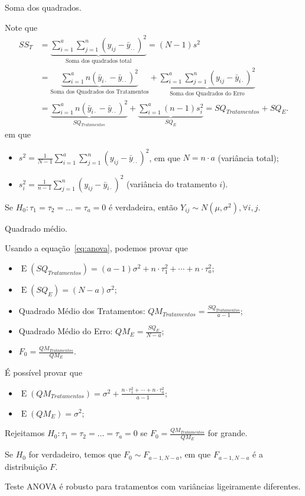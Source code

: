 \documentclass[8pt]{beamer}
\DeclareMathOperator{\espe}{E}
\begin{document}
\begin{frame}{Soma dos quadrados.}

Note que
\normalsize 
\begin{align*}
SS_{T} &= \underbrace{\sum_{i=1}^{a} \sum_{j=1}^{n} (y_{ij} - \bar{y}_{\cdot \cdot})^2}_{\mbox{Soma dos quadrados total}} = (N-1)s^2\\
&= \underbrace{ \sum_{i=1}^{a} n (\bar{y}_{i\cdot} - \bar{y}_{\cdot \cdot})^2 }_{\mbox{Soma dos Quadrados dos Tratamentos}} + \underbrace{\sum_{i=1}^{a} \sum_{j=1}^{n} (y_{ij} - \bar{y}_{i\cdot})^2 }_{\mbox{Soma dos Quadrados do Erro}}\\
&= \underbrace{\sum_{i=1}^{a} n (\bar{y}_{i \cdot } - \bar{y}_{\cdot \cdot})^2 }_{SQ_{Tratamentos}} + \underbrace{\sum_{i=1}^{a} (n-1) s_i^2}_{SQ_E} = SQ_{Tratamentos} + SQ_E.
\end{align*}
\normalsize
em que
\begin{itemize}
	\item  $s^2 = \frac{1}{N-1} \sum_{i=1}^{a} \sum_{j=1}^{n} (y_{ij} - \bar{y}_{\cdot \cdot})^2$, em que $N = n\cdot a$ (variância total);
	\item $s^2_i = \frac{1}{n-1} \sum_{j=1}^{n} (y_{ij} - \bar{y}_{i\cdot})^2$ (variância do tratamento $i$).
\end{itemize}
Se $H_0: \tau_1 = \tau_2 = \dots = \tau_a = 0$ é verdadeira, então $Y_{ij} \sim N(\mu, \sigma^2), \forall i,j$.
\end{frame}

\begin{frame}{Quadrado médio.}

Usando a equação~\eqref{eq:anova}, podemos provar que 
\begin{itemize}
	\item $\espe\left(SQ_{Tratamentos}\right) = (a-1) \sigma^2 +  n \cdot \tau_1^2 + \cdots + n \cdot \tau_a^2$;
	\item $\espe\left( SQ_E \right) = (N - a ) \sigma^2$;
	\item Quadrado Médio dos Tratamentos: $QM_{Tratamentos} = \frac{SQ_{Tratamentos}}{a-1}$;
	\item Quadrado Médio do Erro: $QM_E = \frac{SQ_{E}}{N-a}$;
	\item $F_0 = \frac{QM_{Tratamentos}}{QM_E}$.
\end{itemize}
\vfill

É possível provar que 
\begin{itemize}
	\item $\espe\left(QM_{Tratamentos}\right) = \sigma^2 + \frac{n \cdot \tau_1^2 + \cdots + n \cdot \tau_a^2}{a-1}$;
	\item $\espe \left( QM_{E} \right)= \sigma^2$;
\end{itemize}

Rejeitamos $H_0: \tau_1 = \tau_2 = \dots = \tau_a = 0$ se $F_0 = \frac{QM_{Tratamentos}}{QM_E}$ for grande.

Se $H_0$ for verdadeiro, temos que $F_0 \sim F_{a-1, N-a}$, em que $F_{a-1, N-a}$ é a distribuição $F$.

Teste ANOVA é robusto para tratamentos com variâncias ligeiramente diferentes.

\end{frame}
\end{document}
